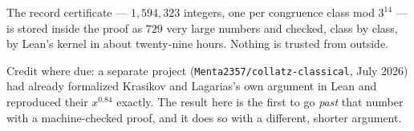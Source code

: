 \documentclass[11pt]{article}
\begin{document}
The record certificate --- $1{,}594{,}323$ integers, one per congruence
class mod $3^{14}$ --- is stored inside the proof as $729$ very large
numbers and checked, class by class, by Lean's kernel in about
twenty-nine hours. Nothing is trusted from outside.

Credit where due: a separate project (\texttt{Menta2357/collatz-classical},
July 2026) had already formalized Krasikov and Lagarias's own argument
in Lean and reproduced their $x^{0.84}$ exactly. The result here is the
first to go \emph{past} that number with a machine-checked proof, and
it does so with a different, shorter argument.
\end{document}

